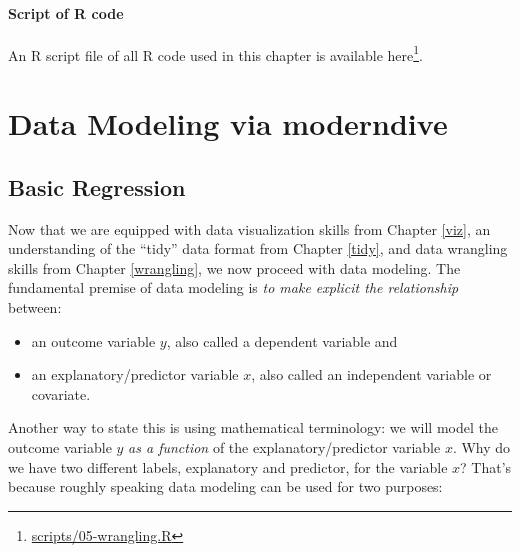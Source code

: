 \documentclass[12pt,]{krantz}
\providecommand{\tightlist}{%
  \setlength{\itemsep}{0pt}\setlength{\parskip}{0pt}}
\renewcommand{\href}[2]{#2\footnote{\url{#1}}}
\theoremstyle{definition}
\theoremstyle{definition}
\theoremstyle{definition}
\theoremstyle{remark}
\begin{document}
\subsection{Script of R code}\label{script-of-r-code-2}

An R script file of all R code used in this chapter is available
\href{scripts/05-wrangling.R}{here}.

\part{Data Modeling via
moderndive}\label{part-data-modeling-via-moderndive}

\chapter{Basic Regression}\label{regression}

Now that we are equipped with data visualization skills from Chapter
\ref{viz}, an understanding of the ``tidy'' data format from Chapter
\ref{tidy}, and data wrangling skills from Chapter \ref{wrangling}, we
now proceed with data modeling. The fundamental premise of data modeling
is \emph{to make explicit the relationship} between:

\begin{itemize}
\tightlist
\item
  an outcome variable \(y\), also called a dependent variable and
\item
  an explanatory/predictor variable \(x\), also called an independent
  variable or covariate.
\end{itemize}

Another way to state this is using mathematical terminology: we will
model the outcome variable \(y\) \emph{as a function} of the
explanatory/predictor variable \(x\). Why do we have two different
labels, explanatory and predictor, for the variable \(x\)? That's
because roughly speaking data modeling can be used for two purposes:
\end{document}
